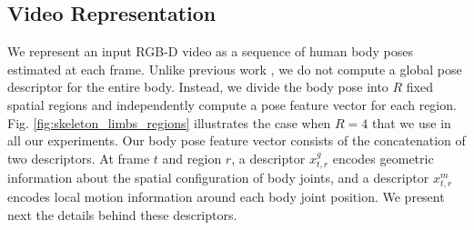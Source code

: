 \subsection{Video Representation} \label{subsec:videorepresentation}
\begin{comment}
\textbf{OLD }We represent actions as a sequence of human body poses estimated at each frame.
Our algorithm extracts from RGB-D videos, a feature vector representing body
poses using the methods in \cite{Shotton2011,Chen2010a}.
Specifically,
given a video $D$ with $T$ frames, we extract a feature vector $X = \{x_1,
\ldots, x_T\}$,
where $x_t$ is a set of pose features extracted from the 3D body
configuration estimated at frame $t$.
Our pose features inspired by \cite{Chen2010a} include
relative location between body joints,
angles between limbs and angles between limbs and
planes spanned by body parts.
\end{comment}
We represent an input RGB-D video as a sequence of human body poses estimated at each frame. Unlike 
previous work \cite{Escorcia2012,Sung2012}, we do not
compute a global pose descriptor for the entire body.
Instead, we divide the body pose into $R$ fixed spatial regions
and independently compute a pose feature vector for each region.
Fig. \ref{fig:skeleton_limbs_regions} illustrates the case when $R = 4$ that we use in all our 
experiments. Our body pose feature vector consists of the concatenation of two descriptors. At 
frame $t$ and region $r$, a descriptor $x^{g}_{t,r}$ encodes geometric information about the 
spatial configuration of body joints, and a descriptor $x^{m}_{t,r}$ encodes local motion 
information around each body joint position. We present next the 
details behind these descriptors.


